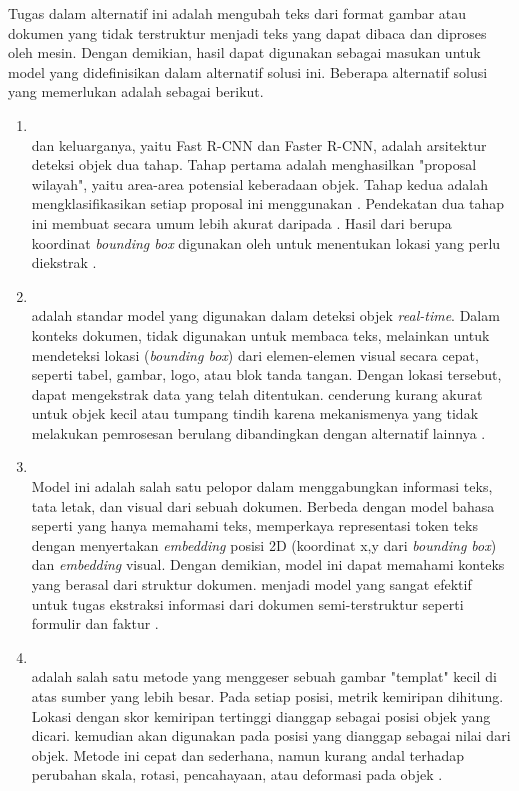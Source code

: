 Tugas \ocr{} dalam alternatif ini adalah mengubah teks dari format gambar atau dokumen yang tidak terstruktur menjadi teks yang dapat dibaca dan diproses oleh mesin. Dengan demikian, hasil \ocr{} dapat digunakan sebagai masukan untuk model yang didefinisikan dalam alternatif solusi ini. Beberapa alternatif solusi yang memerlukan \ocr{} adalah sebagai berikut.
\begin{enumerate}
    \item \rcnn{} ~\\ \rcnn{} dan keluarganya, yaitu Fast R-CNN dan Faster R-CNN, adalah arsitektur deteksi objek dua tahap. Tahap pertama adalah menghasilkan "proposal wilayah", yaitu area-area potensial keberadaan objek. Tahap kedua adalah mengklasifikasikan setiap proposal ini menggunakan \cnn. Pendekatan dua tahap ini membuat \rcnn{} secara umum lebih akurat daripada \yolo. Hasil dari \rcnn{} berupa koordinat \emph{bounding box} digunakan oleh \ocr{} untuk menentukan lokasi yang perlu diekstrak \parencite{xie2021oriented}.
    \item \yolo ~\\ \yolo{} adalah standar model yang digunakan dalam deteksi objek \textit{real-time}. Dalam konteks dokumen, \yolo{} tidak digunakan untuk membaca teks, melainkan untuk mendeteksi lokasi (\emph{bounding box}) dari elemen-elemen visual secara cepat, seperti tabel, gambar, logo, atau blok tanda tangan. Dengan lokasi tersebut, \ocr{} dapat mengekstrak data yang telah ditentukan. \yolo{} cenderung kurang akurat untuk objek kecil atau tumpang tindih karena mekanismenya yang tidak melakukan pemrosesan berulang dibandingkan dengan alternatif lainnya \parencite{diwan2023object}.
    \item \layoutlm ~\\ Model ini adalah salah satu pelopor dalam menggabungkan informasi teks, tata letak, dan visual dari sebuah dokumen. Berbeda dengan model bahasa seperti \bert{} yang hanya memahami teks, \layoutlm{} memperkaya representasi token teks dengan menyertakan \textit{embedding} posisi 2D (koordinat x,y dari \emph{bounding box}) dan \textit{embedding} visual. Dengan demikian, model ini dapat memahami konteks yang berasal dari struktur dokumen. \layoutlm{} menjadi model yang sangat efektif untuk tugas ekstraksi informasi dari dokumen semi-terstruktur seperti formulir dan faktur \parencite{xu2020layoutlm}.
    \item \templatematching{} ~\\ \templatematching{} adalah salah satu metode \cv{} yang menggeser sebuah gambar "templat" kecil di atas sumber yang lebih besar. Pada setiap posisi, metrik kemiripan dihitung. Lokasi dengan skor kemiripan tertinggi dianggap sebagai posisi objek yang dicari. \ocr{} kemudian akan digunakan pada posisi yang dianggap sebagai nilai dari objek. Metode ini cepat dan sederhana, namun kurang andal terhadap perubahan skala, rotasi, pencahayaan, atau deformasi pada objek \parencite{bradski2008learning}.

\end{enumerate}

